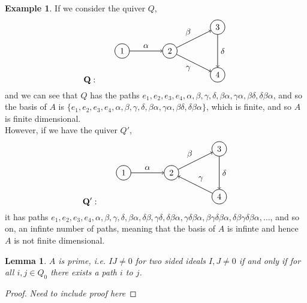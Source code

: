 \documentclass[11.5pt, twoside, a4paper, titlepage]{report}
\providecommand{\equ}[0]{\begin{equation*}}
\providecommand{\eequ}[0] {\end{equation*}}
\theoremstyle{definition}
\newtheorem{eg}[mydef]{Example}
\theoremstyle{plain}
\newtheorem{lem}[mydef]{Lemma}
\begin{document}
\begin{eg}
If we consider the quiver $Q$, 
\equ
\mathbf{Q}: \qquad
\begin{tikzpicture}[->,-latex, auto, every path/.style={->, semithick}, main node/.style={draw, circle}]
\node	[main node]		(1) at (0,0)		{1};
\node [main node]		(2) at (2,0)		{2};
\node [main node]		(3) at (4,1)		{3};
\node [main node]		(4) at (4,-1)		{4};

\draw (1) edge node [auto] {$\alpha$} (2);
\draw (2) edge node [auto] {$\beta$} (3);
\draw (2) edge node [auto, swap] {$\gamma$} (4);
\draw (3) edge node [auto] {$\delta$} (4);
\end{tikzpicture}
\eequ
and we can see that $Q$ has the paths $e_1, e_2, e_3, e_4, \alpha, \beta, \gamma, \delta, \beta\alpha, \gamma\alpha, \beta\delta, \delta\beta\alpha$, and so the basis of $A$ is $\{e_1, e_2, e_3, e_4, \alpha, \beta, \gamma, \delta, \beta\alpha, \gamma\alpha, \beta\delta, \delta\beta\alpha\}$, which is finite, and so $A$ is finite dimensional. \\
However, if we have the quiver $Q'$, 
\equ
\mathbf{Q'}: \qquad
\begin{tikzpicture}[->,-latex, auto, every path/.style={->, semithick}, main node/.style={draw, circle}]
\node	[main node]		(1) at (0,0)		{1};
\node [main node]		(2) at (2,0)		{2};
\node [main node]		(3) at (4,1)		{3};
\node [main node]		(4) at (4,-1)		{4};

\draw (1) edge node [auto] {$\alpha$} (2);
\draw (2) edge node [auto] {$\beta$} (3);
\draw (4) edge node [auto, swap] {$\gamma$} (2);
\draw (3) edge node [auto] {$\delta$} (4);
\end{tikzpicture}
\eequ
it has paths $e_1, e_2, e_3, e_4, \alpha, \beta, \gamma, \delta, \beta\alpha,\delta\beta, \gamma\delta, \delta\beta\alpha, \gamma\delta\beta\alpha, \beta\gamma\delta\beta\alpha, \delta\beta\gamma\delta\beta\alpha, \dots$, and so on, an infinte number of paths, meaning that the basis of $A$ is infinte and hence $A$ is not finite dimensional.
\end{eg}

\begin{lem}
$A$ is prime, i.e. $IJ\neq 0$ for two sided ideals $I, J \neq 0$ if and only if for all $i, j \in Q_0$ there exists a path $i$ to $j$.
\end{lem}
\begin{proof}
\emph{Need to include proof here}
\end{proof}
\end{document}
